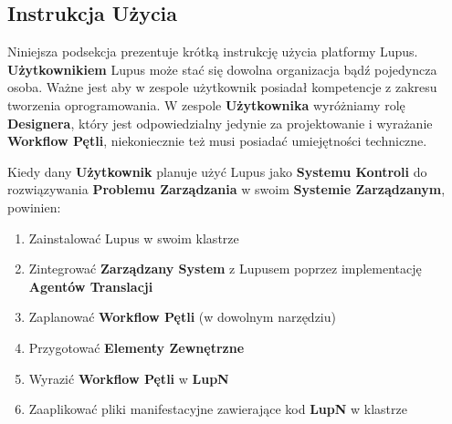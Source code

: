 \subsection{Instrukcja Użycia}

Niniejsza podsekcja prezentuje krótką instrukcję użycia platformy Lupus. \textbf{Użytkownikiem} Lupus może stać się dowolna organizacja bądź pojedyncza osoba. Ważne jest aby w zespole użytkownik posiadał kompetencje z zakresu tworzenia oprogramowania. W zespole \textbf{Użytkownika} wyróżniamy rolę \textbf{Designera}, który jest odpowiedzialny jedynie za projektowanie i wyrażanie \textbf{Workflow Pętli}, niekoniecznie też musi posiadać umiejętności techniczne. 

Kiedy dany \textbf{Użytkownik} planuje użyć Lupus jako \textbf{Systemu Kontroli} do rozwiązywania \textbf{Problemu Zarządzania} w swoim \textbf{Systemie Zarządzanym}, powinien:
\begin{enumerate}
    \item Zainstalować Lupus w swoim klastrze
    \item Zintegrować \textbf{Zarządzany System} z Lupusem poprzez implementację \textbf{Agentów Translacji}
    \item Zaplanować \textbf{Workflow Pętli} (w dowolnym narzędziu)
    \item Przygotować \textbf{Elementy Zewnętrzne} 
    \item Wyrazić \textbf{Workflow Pętli} w \textbf{LupN} 
    \item Zaaplikować pliki manifestacyjne zawierające kod \textbf{LupN} w klastrze
\end{enumerate}

